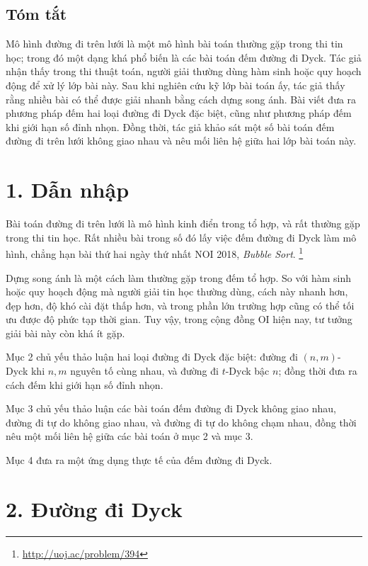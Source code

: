 \documentclass[11pt]{article}
\begin{document}
\subsection*{Tóm tắt}

Mô hình đường đi trên lưới là một mô hình bài toán thường gặp trong thi tin
học; trong đó một dạng khá phổ biến là các bài toán đếm đường đi Dyck. Tác
giả nhận thấy trong thi thuật toán, người giải thường dùng hàm sinh hoặc quy
hoạch động để xử lý lớp bài này. Sau khi nghiên cứu kỹ lớp bài toán ấy, tác
giả thấy rằng nhiều bài có thể được giải nhanh bằng cách dựng song ánh. Bài
viết đưa ra phương pháp đếm hai loại đường đi Dyck đặc biệt, cũng như phương
pháp đếm khi giới hạn số đỉnh nhọn. Đồng thời, tác giả khảo sát một số bài
toán đếm đường đi trên lưới không giao nhau và nêu mối liên hệ giữa hai lớp
bài toán này.

\section*{1. Dẫn nhập}

Bài toán đường đi trên lưới là mô hình kinh điển trong tổ hợp, và rất thường
gặp trong thi tin học. Rất nhiều bài trong số đó lấy việc đếm đường đi Dyck
làm mô hình, chẳng hạn bài thứ hai ngày thứ nhất NOI 2018, \emph{Bubble Sort}.
\footnote{\url{http://uoj.ac/problem/394}}

Dựng song ánh là một cách làm thường gặp trong đếm tổ hợp. So với hàm sinh
hoặc quy hoạch động mà người giải tin học thường dùng, cách này nhanh hơn,
đẹp hơn, độ khó cài đặt thấp hơn, và trong phần lớn trường hợp cũng có thể tối
ưu được độ phức tạp thời gian. Tuy vậy, trong cộng đồng OI hiện nay, tư tưởng
giải bài này còn khá ít gặp.

Mục 2 chủ yếu thảo luận hai loại đường đi Dyck đặc biệt: đường đi
\((n,m)\)-Dyck khi \(n,m\) nguyên tố cùng nhau, và đường đi \(t\)-Dyck bậc
\(n\); đồng thời đưa ra cách đếm khi giới hạn số đỉnh nhọn.

Mục 3 chủ yếu thảo luận các bài toán đếm đường đi Dyck không giao nhau, đường
đi tự do không giao nhau, và đường đi tự do không chạm nhau, đồng thời nêu một
mối liên hệ giữa các bài toán ở mục 2 và mục 3.

Mục 4 đưa ra một ứng dụng thực tế của đếm đường đi Dyck.

\section*{2. Đường đi Dyck}
\end{document}
